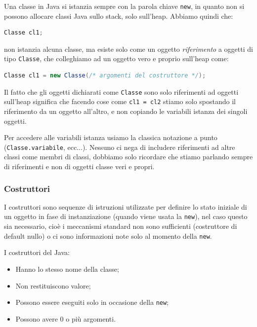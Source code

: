 \documentclass[a4paper,11pt]{article}
\begin{document}
Una classe in Java si istanzia sempre con la parola chiave \lstinline|new|, in quanto non si possono allocare classi Java sullo stack, solo sull'heap.
Abbiamo quindi che:
\begin{lstlisting}[language=java, style=codestyle]	
Classe cl1;
\end{lstlisting}
non istanzia alcuna classe, ma esiste solo come un oggetto \textit{riferimento} a oggetti di tipo \lstinline|Classe|, che colleghiamo ad un oggetto vero e proprio sull'heap come:
\begin{lstlisting}[language=java, style=codestyle]	
Classe cl1 = new Classe(/* argomenti del costruttore */);
\end{lstlisting}

Il fatto che gli oggetti dichiarati come \lstinline|Classe| sono solo riferimenti ad oggetti sull'heap significa che facendo cose come \lstinline|cl1 = cl2| stiamo solo spostando il riferimento da un oggetto all'altro, e non copiando le variabili istanza dei singoli oggetti.

Per accedere alle variabili istanza usiamo la classica notazione a punto (\lstinline|Classe.variabile|, ecc...).
Nessuno ci nega di includere riferimenti ad altre classi come membri di classi, dobbiamo solo ricordare che stiamo parlando sempre di riferimenti e non di oggetti classe veri e propri.

\subsubsection{Costruttori}
I costruttori sono sequenze di istruzioni utilizzate per definire lo stato iniziale di un oggetto in fase di instanziazione (quando viene usata la \lstinline|new|), nel caso questo sia necessario, cioè i meccanismi standard non sono sufficienti (costruttore di default nullo) o ci sono informazioni note solo al momento della \lstinline|new|.

I costruttori del Java:
\begin{itemize}
	\item Hanno lo stesso nome della classe;
	\item Non restituiscono valore;
	\item Possono essere eseguiti solo in occasione della \lstinline|new|;
	\item Possono avere 0 o più argomenti.
\end{itemize}
\end{document}
